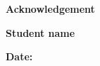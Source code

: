 
\begin{center}
{\Large \bf Acknowledgement}
\end{center}


\vspace{5cm}
\begin{flushright}
{\bf{Student name}}
\end{flushright}

\vspace{-1.5cm}
\begin{flushleft}
{\bf{Date:}}
\end{flushleft}